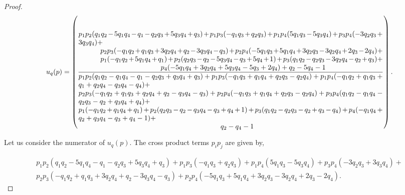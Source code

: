 \documentclass[10pt]{article}
\begin{document}
\begin{proof}
    \begingroup
    \footnotesize
    \begin{equation}
        u_q(p) =
        \left(
          \frac
            {\parbox{6in}{$
                p_{1} p_{2} (q_{1} q_{2} - 5 q_{1} q_{4} - q_{1} - q_{2} q_{3} + 5 q_{3} q_{4} + q_{3}) + p_{1} p_{3} (- q_{1} q_{3} + q_{2} q_{3}) + p_{1} p_{4} (5 q_{1} q_{3} - 5 q_{3} q_{4}) + p_{3} p_{4} (- 3 q_{2} q_{3} + 3 q_{3} q_{4}) +$ \\
                \hspace*{1cm} $ p_{2} p_{3} (- q_{1} q_{2} + q_{1} q_{3} + 3 q_{2} q_{4} + q_{2} - 3 q_{3} q_{4} - q_{3}) + p_{2} p_{4} (- 5 q_{1} q_{3} + 5 q_{1} q_{4} + 3 q_{2} q_{3} - 3 q_{2} q_{4} + 2 q_{3} - 2 q_{4}) + $ \\
                \hspace*{1cm} $ p_{1} (- q_{1} q_{2} + 5 q_{1} q_{4} + q_{1}) + p_{2} (q_{2} q_{3} - q_{2} - 5 q_{3} q_{4} - q_{3} + 5 q_{4} + 1) + p_{3} (q_{1} q_{2} - q_{2} q_{3} - 3 q_{2} q_{4} - q_{2} + q_{3}) +$ \\
                \hspace*{4cm} $ p_{4} (- 5 q_{1} q_{4} + 3 q_{2} q_{4} + 5 q_{3} q_{4} - 5 q_{3} + 2 q_{4}) + q_{2} - 5 q_{4} - 1$
            }}
            {\parbox{6in}{$
            p_{1} p_{2} (q_{1} q_{2} - q_{1} q_{4} - q_{1} - q_{2} q_{3} + q_{3} q_{4} + q_{3}) + p_{1} p_{3} (- q_{1} q_{3} + q_{1} q_{4} + q_{2} q_{3} - q_{2} q_{4}) + p_{1} p_{4} (- q_{1} q_{2} + q_{1} q_{3} + q_{1} + q_{2} q_{4} - q_{3} q_{4} - q_{4}) +$ \\
            $ p_{2} p_{3} (- q_{1} q_{2} + q_{1} q_{3} + q_{2} q_{4} + q_{2} - q_{3} q_{4} - q_{3}) + p_{2} p_{4} (- q_{1} q_{3} + q_{1} q_{4} + q_{2} q_{3} - q_{2} q_{4}) + p_{3} p_{4} (q_{1} q_{2} - q_{1} q_{4} - q_{2} q_{3} - q_{2} + q_{3} q_{4} + q_{4}) + $ \\
            $ p_{1} (- q_{1} q_{2} + q_{1} q_{4} + q_{1}) + p_{2} (q_{2} q_{3} - q_{2} - q_{3} q_{4} - q_{3} + q_{4} + 1) + p_{3} (q_{1} q_{2} - q_{2} q_{3} - q_{2} + q_{3} - q_{4}) + p_{4} (- q_{1} q_{4} + q_{2} + q_{3} q_{4} - q_{3} + q_{4} - 1) + $ \\
            \hspace*{7cm} $q_{2} - q_{4} - 1$
          }}
        \right).
    \end{equation}
    \endgroup
    
    Let us consider the numerator of \(u_q(p)\). The cross product terms \(p_ip_j\)
    are given by,
    
    \begingroup
    \footnotesize
    \begin{align*}
    p_{1} p_{2} (q_{1} q_{2} - 5 q_{1} q_{4} - q_{1} - q_{2} q_{3} + 5 q_{3} q_{4}
    + q_{3}) + p_{1} p_{3} (- q_{1} q_{3} + q_{2} q_{3}) + p_{1} p_{4} (5 q_{1} q_{3} -
    5 q_{3} q_{4}) + p_{3} p_{4} (- 3 q_{2} q_{3} + 3 q_{3} q_{4}) +  \\
    p_{2} p_{3} (- q_{1} q_{2} + q_{1} q_{3} + 3 q_{2} q_{4} + q_{2} - 3 q_{3} q_{4} - q_{3}) +
    p_{2} p_{4} (- 5 q_{1} q_{3} + 5 q_{1} q_{4} + 3 q_{2} q_{3} - 3 q_{2} q_{4} +
    2 q_{3} - 2 q_{4}).
    \end{align*}
    \endgroup
    

\end{proof}
\end{document}

